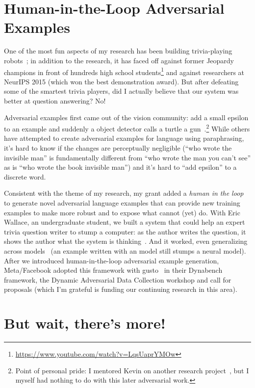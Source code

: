 \section{Human-in-the-Loop Adversarial Examples}

One of the most fun aspects of my research has been building
trivia-playing robots~\cite{boyd-graber-12,iyyer-14b,iyyer-15}; in
addition to the research, it has faced off against former Jeopardy
champions in front of hundreds high school
students\footnote{\url{https://www.youtube.com/watch?v=LqsUaprYMOw}}
and against researchers at NeurIPS 2015 (which won the best
demonstration award).
%
But after defeating some of the smartest trivia players, did I
actually believe that our system was better at question answering?
%
No!

Adversarial examples first came out of the vision community: add a
small epsilon to an example and suddenly a object detector calls a
turtle a gun~\cite{athalye-18}.\footnote{Point of personal pride: I
mentored Kevin on another research project~\cite{he-16}, but
I myself had nothing to do with this later adversarial work.}
%
While others have attempted to create adversarial examples for
language using paraphrasing, it's hard to know if the changes are
perceptually negligible (``who wrote the invisible man'' is
fundamentally different from ``who wrote the man you can't see'' as is
``who wrote the book invisible man'') and
it's hard to ``add epsilon'' to a discrete word.

Consistent with the theme of my research, my  grant
added a \emph{human in the loop} to generate novel adversarial
language examples that can provide new training examples to make
 more robust and to expose what  cannot (yet) do.
%
With Eric Wallace, an undergraduate student, we built a system that
could help an expert trivia question writer to stump a computer: as
the author writes the question, it shows the author what the system is
thinking~\cite{wallace-18}.
%
And it worked, even generalizing across models~\cite{wallace-19} (an
example written with an  model still stumps a neural model).
%
After we introduced human-in-the-loop adversarial example generation,
Meta/Facebook adopted this framework with gusto~\cite{bartolo-20} in
their Dynabench framework, the Dynamic Adversarial Data Collection
workshop and call for proposals (which I'm grateful is funding our
continuing research in this area).

\section{But wait, there's more!}

